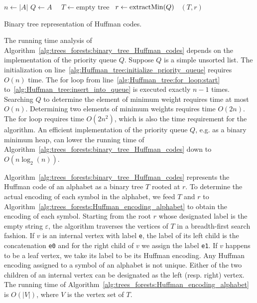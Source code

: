 \begin{algorithm}[!htpb]
\dontprintsemicolon  %
\BlankLine
$n \leftarrow |A|$\;
$Q \leftarrow A$~~\;
$T \leftarrow \text{empty tree}$~\;
$r \leftarrow \operatorname*{extractMin}(Q)$~\;
\Return $(T, r)$~\;
\caption{Binary tree representation of Huffman codes.}
\label{alg:trees_forests:binary_tree_Huffman_codes}
\end{algorithm}

The running time analysis of
Algorithm~\ref{alg:trees_forests:binary_tree_Huffman_codes} depends on
the implementation of the priority queue $Q$. Suppose $Q$ is a simple
unsorted list. The initialization on
line~\ref{alg:Huffman_tree:initialize_priority_queue} requires $O(n)$
time. The for loop from line~\ref{alg:Huffman_tree:for_loop:start}
to~\ref{alg:Huffman_tree:insert_into_queue} is executed exactly
$n - 1$ times. Searching $Q$ to determine the element of minimum
weight requires time at most $O(n)$. Determining two elements of
minimum weights requires time $O(2n)$. The for loop requires time
$O(2n^2)$, which is also the time requirement for the algorithm. An
efficient implementation of the priority queue $Q$, e.g. as a binary
minimum heap, can lower the running time of
Algorithm~\ref{alg:trees_forests:binary_tree_Huffman_codes} down to
$O(n \log_2(n))$.

Algorithm~\ref{alg:trees_forests:binary_tree_Huffman_codes} represents
the Huffman code of an alphabet as a binary tree $T$ rooted at $r$. To
determine the actual encoding of each symbol in the alphabet, we feed
$T$ and $r$ to
Algorithm~\ref{alg:trees_forests:Huffman_encoding_alphabet} to obtain
the encoding of each symbol. Starting from the root $r$ whose
designated label is the empty string $\varepsilon$, the algorithm
traverses the vertices of $T$ in a breadth-first search fashion. If
$v$ is an internal vertex with label \verb!e!, the label of its left
child is the concatenation \verb!e0! and for the right child of $v$ we
assign the label \verb!e1!. If $v$ happens to be a leaf vertex, we
take its label to be its Huffman encoding. Any Huffman encoding
assigned to a symbol of an alphabet is not unique. Either of the two
children of an internal vertex can be designated as the left
(resp. right) vertex. The running time of
Algorithm~\ref{alg:trees_forests:Huffman_encoding_alphabet} is
$O(|V|)$, where $V$ is the vertex set of $T$.

